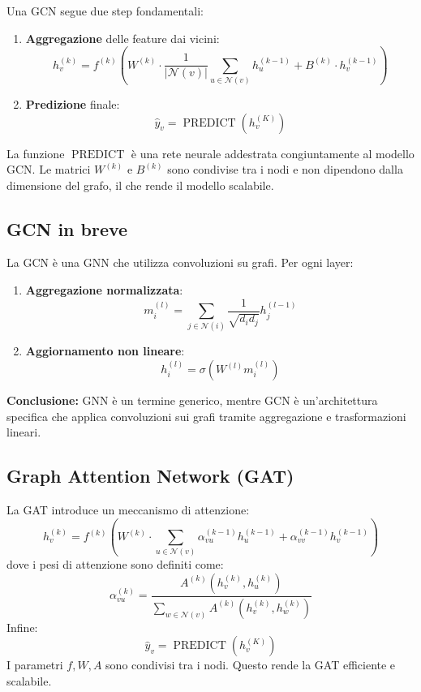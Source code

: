 Una GCN segue due step fondamentali:
\begin{enumerate}
    \item \textbf{Aggregazione} delle feature dai vicini:
    \[
        h_v^{(k)} = f^{(k)}\left(W^{(k)} \cdot \frac{1}{|\mathcal{N}(v)|} \sum_{u \in \mathcal{N}(v)} h_u^{(k-1)} + B^{(k)} \cdot h_v^{(k-1)}\right)
    \]
    \item \textbf{Predizione} finale:
    \[
        \hat y_v = \operatorname{PREDICT}(h_v^{(K)})
    \]
\end{enumerate}

La funzione \( \operatorname{PREDICT} \) è una rete neurale addestrata congiuntamente al modello GCN. Le matrici \( W^{(k)} \) e \( B^{(k)} \) sono condivise tra i nodi e non dipendono dalla dimensione del grafo, il che rende il modello scalabile.

\subsection{GCN in breve}

La GCN è una GNN che utilizza convoluzioni su grafi. Per ogni layer:
\begin{enumerate}
    \item \textbf{Aggregazione normalizzata}:
    \[
        m_i^{(l)} = \sum_{j\in \mathcal{N}(i)} \frac{1}{\sqrt{d_i d_j}} h_j^{(l-1)}
    \]
    \item \textbf{Aggiornamento non lineare}:
    \[
        h_i^{(l)} = \sigma(W^{(l)} m_i^{(l)})
    \]
\end{enumerate}

\textbf{Conclusione:} GNN è un termine generico, mentre GCN è un’architettura specifica che applica convoluzioni sui grafi tramite aggregazione e trasformazioni lineari.

\subsection{Graph Attention Network (GAT)}

La GAT introduce un meccanismo di attenzione:
\[
    h_v^{(k)} = f^{(k)}\left(W^{(k)} \cdot \sum_{u \in \mathcal{N}(v)} \alpha_{vu}^{(k-1)} h_u^{(k-1)} + \alpha_{vv}^{(k-1)} h_v^{(k-1)}\right)
\]
dove i pesi di attenzione sono definiti come:
\[
    \alpha_{vu}^{(k)} = \frac{A^{(k)}(h_v^{(k)}, h_u^{(k)})}{\sum_{w\in\mathcal{N}(v)} A^{(k)}(h_v^{(k)}, h_w^{(k)})}
\]
Infine:
\[
    \hat y_v = \operatorname{PREDICT}(h_v^{(K)})
\]
I parametri \( f, W, A \) sono condivisi tra i nodi. Questo rende la GAT efficiente e scalabile.

